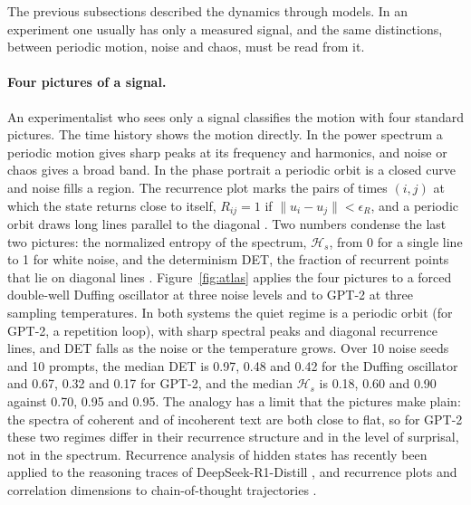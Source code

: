 The previous subsections described the dynamics through models. In an experiment one usually has only a measured signal, and the same distinctions, between periodic motion, noise and chaos, must be read from it.

\paragraph{Four pictures of a signal.} An experimentalist who sees only a signal classifies the motion with four standard pictures. The time history shows the motion directly. In the power spectrum a periodic motion gives sharp peaks at its frequency and harmonics, and noise or chaos gives a broad band. In the phase portrait a periodic orbit is a closed curve and noise fills a region. The recurrence plot marks the pairs of times $(i,j)$ at which the state returns close to itself, $R_{ij}=1$ if $\|u_i-u_j\|<\epsilon_R$, and a periodic orbit draws long lines parallel to the diagonal \citep{eckmann1987recurrence}. Two numbers condense the last two pictures: the normalized entropy of the spectrum, $\mathcal{H}_s$, from 0 for a single line to 1 for white noise, and the determinism DET, the fraction of recurrent points that lie on diagonal lines \citep{marwan2007recurrence}. Figure~\ref{fig:atlas} applies the four pictures to a forced double-well Duffing oscillator at three noise levels and to GPT-2 at three sampling temperatures. In both systems the quiet regime is a periodic orbit (for GPT-2, a repetition loop), with sharp spectral peaks and diagonal recurrence lines, and DET falls as the noise or the temperature grows. Over 10 noise seeds and 10 prompts, the median DET is 0.97, 0.48 and 0.42 for the Duffing oscillator and 0.67, 0.32 and 0.17 for GPT-2, and the median $\mathcal{H}_s$ is 0.18, 0.60 and 0.90 against 0.70, 0.95 and 0.95. The analogy has a limit that the pictures make plain: the spectra of coherent and of incoherent text are both close to flat, so for GPT-2 these two regimes differ in their recurrence structure and in the level of surprisal, not in the spectrum. Recurrence analysis of hidden states has recently been applied to the reasoning traces of DeepSeek-R1-Distill \citep{pham2026mind}, and recurrence plots and correlation dimensions to chain-of-thought trajectories \citep{jaca2026chaos}.

